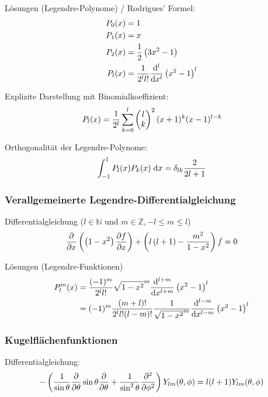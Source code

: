 \documentclass[11pt]{article}
\numberwithin{equation}{section}
\begin{document}
				\noindent
				Lösungen (Legendre-Polynome) / Rodrigues' Formel:
				\begin{equation} \label{eq:legendre-polynome}
					\begin{aligned}
						P_0(x) &= 1 \\
						P_1(x) &= x \\
						P_2(x) &= \frac{1}{2}\left(3x^2-1\right) \\
						P_l(x) &= \frac{1}{2^l l!}\frac{\mathrm{d}^l}{\mathrm{d} x^l}\left(x^2-1\right)^l \\
					\end{aligned}
				\end{equation}

				\noindent
				Explizite Darstellung mit Binomialkoeffizient:
				\begin{equation}
					P_l(x)=\frac{1}{2^l} \sum_{k=0}^{l}\left(\begin{matrix}l\\k\end{matrix}\right)^2(x+1)^k(x-1)^{l-k}
				\end{equation}

				\noindent
				Orthogonalität der Legendre-Polynome:
				\begin{equation}
					\int_{-1}^1 P_l(x) P_k(x)\;\mathrm{d} x = \delta_{lk} \frac{2}{2l+1}
				\end{equation}

			\subsubsection{Verallgemeinerte Legendre-Differentialgleichung}
				\noindent
				Differentialgleichung ($l\in\mathbb{N}$ und $m\in\mathbb{Z}, -l\le m\le l$)
				\begin{equation}
					\frac{\partial }{\partial x}\left(\left(1-x^2\right)\frac{\partial f}{\partial x}\right)+\left(l\left(l+1\right)-\frac{m^2}{1-x^2}\right)f= 0
				\end{equation}

				\noindent
				Lösungen (Legendre-Funktionen)
				\begin{equation}
					\begin{aligned}
						P_l^m(x) &= \frac{(-1)^m}{2^l l!}\sqrt{1-x^2}^m
						\frac{\mathrm{d}^{l+m}}{\mathrm{d} x^{l+m}}\left(x^2-1\right)^l \\
						&= (-1)^m \frac{(m+l)!}{2^l l! (l-m)!}\frac{1}{\sqrt{1-x^2}^m}
						\frac{\mathrm{d}^{l-m}}{\mathrm{d} x^{l-m}}\left(x^2-1\right)^l \\
					\end{aligned}
				\end{equation}

			\subsubsection{Kugelflächenfunktionen}
				\noindent
				Differentialgleichung:
				\begin{equation}
					-\left(
					\frac{1}{\sin\theta}\frac{\partial }{\partial \theta}\sin\theta\frac{\partial }{\partial \theta} + \frac{1}{\sin^2\theta}\frac{\partial^2}{\partial \phi^2}
					\right)
					Y_{lm}(\theta,\phi) = l(l+1)Y_{lm}(\theta,\phi)
				\end{equation}
\end{document}
